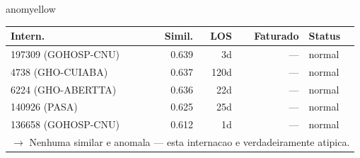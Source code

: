 \documentclass[a4paper,10pt]{article}
\begin{document}
\begin{anomalycard}[Internacao 721 | GHO-COPEL | MODERADO (z=2.07)]{anomyellow}
\begin{tabular}{l r r r l}\toprule\textbf{Intern.} & \textbf{Simil.} & \textbf{LOS} & \textbf{Faturado} & \textbf{Status} \\\midrule
197309 (GOHOSP-CNU) & 0.639 & 3d & --- & \textcolor{jcubeblue}{normal} \\
4738 (GHO-CUIABA) & 0.637 & 120d & --- & \textcolor{jcubeblue}{normal} \\
6224 (GHO-ABERTTA) & 0.636 & 22d & --- & \textcolor{jcubeblue}{normal} \\
140926 (PASA) & 0.625 & 25d & --- & \textcolor{jcubeblue}{normal} \\
136658 (GOHOSP-CNU) & 0.612 & 1d & --- & \textcolor{jcubeblue}{normal} \\
\multicolumn{5}{l}{\textcolor{jcubeblue}{\small $\rightarrow$ Nenhuma similar e anomala --- esta internacao e verdadeiramente atipica.}} \\
\bottomrule\end{tabular}


\end{anomalycard}

\newpage
\end{document}
